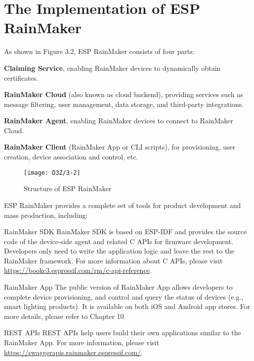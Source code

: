 \documentclass[a4paper,12pt]{book}
\begin{document}
\section{The Implementation of ESP RainMaker}

As shown in Figure 3.2, ESP RainMaker consists of four parts:

\begin{itemize}
    \item \textbf{Claiming Service}, enabling RainMaker devices to dynamically obtain certificates.
    {\setlength{\parskip}{0pt}
    \item \textbf{RainMaker Cloud} (also known as cloud backend), providing services such as message filtering, user management, data storage, and third-party integrations.
    \item \textbf{RainMaker Agent}, enabling RainMaker devices to connect to RainMaker Cloud.
    \item \textbf{RainMaker Client} (RainMaker App or CLI scripts), for provisioning, user creation, device association and control, etc.}
\end{itemize}

\begin{figure}[h!]
    \centering
    \texttt{[image: D3Z/3-2]}
    \caption{Structure of ESP RainMaker}
\end{figure}

ESP RainMaker provides a complete set of tools for product development and mass production, including:

\begin{term}{RainMaker SDK}
    RainMaker SDK is based on ESP-IDF and provides the source code of the device-side agent and related C APIs for firmware development. Developers only need to write the application logic and leave the rest to the RainMaker framework. For more information about C APIs, please visit \url{https://bookc3.espressif.com/rm/c-api-reference}.
\end{term}

\begin{term}{RainMaker App}
    The public version of RainMaker App allows developers to complete device provisioning, and control and query the status of devices (e.g., smart lighting products). It is available on both iOS and Android app stores. For more details, please refer to Chapter 10.
\end{term}

\begin{term}{REST APIs}
    REST APIs help users build their own applications similar to the RainMaker App. For more information, please visit \url{https://swaggerapis.rainmaker.espressif.com/}.
\end{term}
\end{document}
